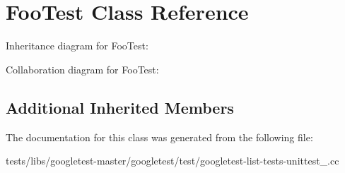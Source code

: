 \hypertarget{classFooTest}{}\section{Foo\+Test Class Reference}
\label{classFooTest}


Inheritance diagram for Foo\+Test\+:


Collaboration diagram for Foo\+Test\+:
\subsection*{Additional Inherited Members}


The documentation for this class was generated from the following file\+:\begin{DoxyCompactItemize}
\item 
tests/libs/googletest-\/master/googletest/test/googletest-\/list-\/tests-\/unittest\+\_\+.\+cc\end{DoxyCompactItemize}
